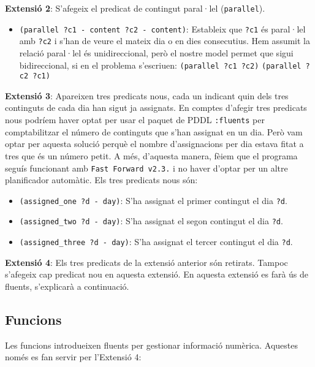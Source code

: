\documentclass[a4paper]{article}
\begin{document}
	\noindent \textbf{Extensió 2}: S'afegeix el predicat de contingut paral·lel (\texttt{parallel}).
	
	\begin{itemize}
		\item \texttt{(parallel ?c1 - content ?c2 - content)}: Estableix que \texttt{?c1} és paral·lel amb \texttt{?c2} i s'han de veure el mateix dia o en dies consecutius. Hem assumit la relació paral·lel és unidireccional, però el nostre model permet que sigui bidireccional, si en el problema s'escriuen: \newline
		\tabto{2cm} \texttt{(parallel ?c1 ?c2)} \newline
		\tabto{2cm} \texttt{(parallel ?c2 ?c1)}
	\end{itemize}
	
	\noindent \textbf{Extensió 3}: Apareixen tres predicats nous, cada un indicant quin dels tres continguts de cada dia han sigut ja assignats. En comptes d'afegir tres predicats nous podríem haver optat per usar el paquet de PDDL \texttt{:fluents} per comptabilitzar el número de continguts que s'han assignat en un dia. Però vam optar per aquesta solució perquè el nombre d'assignacions per dia estava fitat a tres que és un número petit. A més, d'aquesta manera, fèiem que el programa seguís funcionant amb \texttt{Fast Forward v2.3.} i no haver d'optar per un altre planificador automàtic. Els tres predicats nous són:
	
	\begin{itemize}
		\item \texttt{(assigned\_one ?d - day)}: S'ha assignat el primer contingut el dia \texttt{?d}.
		\item \texttt{(assigned\_two ?d - day)}: S'ha assignat el segon contingut el dia \texttt{?d}.
		\item \texttt{(assigned\_three ?d - day)}: S'ha assignat el tercer contingut el dia \texttt{?d}.
	\end{itemize}
	
	\noindent \textbf{Extensió 4}: Els tres predicats de la extensió anterior són retirats. Tampoc s'afegeix cap predicat nou en aquesta extensió. En aquesta extensió es farà ús de fluents, s'explicarà a continuació.
	
	\subsection{Funcions}
	
	Les funcions introdueixen fluents per gestionar informació numèrica. Aquestes només es fan servir per l'Extensió 4:
	
\end{document}
